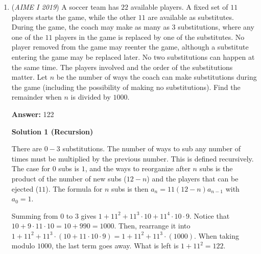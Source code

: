 \begin{enumerate}
 



\textbf{Solution 6 (Using simple trigonometry)}

Let's say that $\angle APF$ = $u$. Then, we know that $\sin(u) = 20/25 = 4/5$. Therefore, the area of $\triangle{APF}$ is $0.5*5*5*\sin(u)=10$. Now, let's do the same thing with $\triangle{BQC}$. If we name $\angle BQC$ as $w$, we know that $\sin(w) = 15/25 = 3/5$. Therefore, the area of $\triangle{BQC}$ is $0.5*5*5*\sin(w)=7.5$. Since $\triangle{ERD}$ is a right-angled isosceles triangle, the area of $\triangle{ERD} = 12.5$. In conclusion, the area of $ABCDEF$ is $\triangle{PRQ}-(\triangle{APF}+\triangle{BQC}+\triangle{ERD})=150-(10+7.5+12.5)=\boxed{120}$.

 


	\item (\textit{AIME I 2019}) A soccer team has $22$ available players. A fixed set of $11$ players starts the game, while the other $11$ are available as substitutes. During the game, the coach may make as many as $3$ substitutions, where any one of the $11$ players in the game is replaced by one of the substitutes. No player removed from the game may reenter the game, although a substitute entering the game may be replaced later. No two substitutions can happen at the same time. The players involved and the order of the substitutions matter. Let $n$ be the number of ways the coach can make substitutions during the game (including the possibility of making no substitutions). Find the remainder when $n$ is divided by $1000$.


 
 \textbf{Answer: }122



\textbf{Solution 1 (Recursion)}

There are $0-3$ substitutions. The number of ways to sub any number of times must be multiplied by the previous number. This is defined recursively. The case for $0$ subs is $1$, and the ways to reorganize after $n$ subs is the product of the number of new subs ($12-n$) and the players that can be ejected ($11$). The formula for $n$ subs is then $a_n=11(12-n)a_{n-1}$ with $a_0=1$. 

 Summing from $0$ to $3$ gives $1+11^2+11^{3}\cdot 10+11^{4}\cdot 10\cdot 9$. Notice that $10+9\cdot11\cdot10=10+990=1000$. Then, rearrange it into $1+11^2+11^3\cdot (10+11\cdot10\cdot9)= 1+11^2+11^3\cdot (1000)$. When taking modulo $1000$, the last term goes away. What is left is $1+11^2=\boxed{122}$.


\end{enumerate}

